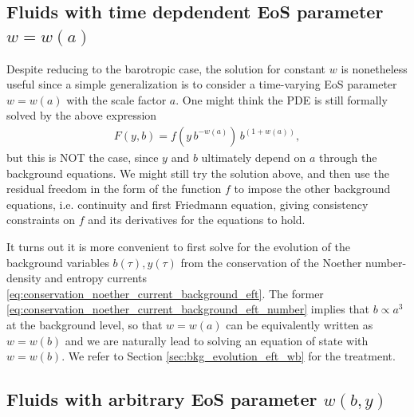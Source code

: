 \subsection{Fluids with time depdendent EoS parameter $w=w(a)$}
%
Despite reducing to the barotropic case, the solution for constant $w$ is nonetheless useful since a simple generalization is to consider a time-varying EoS parameter $w=w(a)$ with the scale factor $a$.
One might think the PDE is still formally solved by the above expression
\begin{align}
    F(y,b)=f(y\,b^{-w(a)})\, b^{(1+w(a))},
\end{align}
but this is NOT the case, since $y$ and $b$ ultimately depend on $a$ through the background equations.
We might still try the solution above, and then use the residual freedom in the form of the function $f$ to impose the other background equations, i.e. continuity and first Friedmann equation, giving consistency constraints on $f$ and its derivatives for the equations to hold.

It turns out it is more convenient to first solve for the evolution of the background variables $b(\tau),y(\tau)$ from the conservation of the Noether number-density and entropy currents \eqref{eq:conservation_noether_current_background_eft}.
The former \eqref{eq:conservation_noether_current_background_eft_number} implies that $b\propto a^3$ at the background level, so that $w=w(a)$ can be equivalently written as $w=w(b)$ and we are naturally lead to solving an equation of state with $w=w(b)$.
We refer to Section \ref{sec:bkg_evolution_eft_wb} for the treatment.


\subsection{Fluids with arbitrary EoS parameter $w(b,y)$}\label{sec:fluids_arbitrary_eos}

